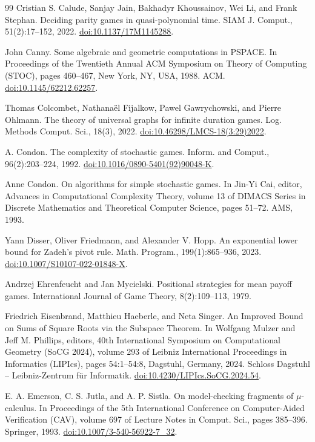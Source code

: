 \documentclass[10pt,a4paper]{article}
\theoremstyle{definition}
\begin{document}
\begin{thebibliography}{99}
 Cristian S. Calude, Sanjay Jain, Bakhadyr Khoussainov, Wei Li, and Frank Stephan. Deciding parity games in quasi-polynomial time. SIAM J. Comput., 51(2):17–152, 2022. \href{https://doi.org/10.1137/17M1145288}{doi:10.1137/17M1145288}.

 John Canny. Some algebraic and geometric computations in PSPACE. In Proceedings of the Twentieth Annual ACM Symposium on Theory of Computing (STOC), pages 460–467, New York, NY, USA, 1988. ACM. \href{https://doi.org/10.1145/62212.62257}{doi:10.1145/62212.62257}.

 Thomas Colcombet, Nathanaël Fijalkow, Pawel Gawrychowski, and Pierre Ohlmann. The theory of universal graphs for infinite duration games. Log. Methods Comput. Sci., 18(3), 2022. \href{https://doi.org/10.46298/LMCS-18(3:29)2022}{doi:10.46298/LMCS-18(3:29)2022}.

 A. Condon. The complexity of stochastic games. Inform. and Comput., 96(2):203–224, 1992. \href{https://doi.org/10.1016/0890-5401(92)90048-K}{doi:10.1016/0890-5401(92)90048-K}.

 Anne Condon. On algorithms for simple stochastic games. In Jin-Yi Cai, editor, Advances in Computational Complexity Theory, volume 13 of DIMACS Series in Discrete Mathematics and Theoretical Computer Science, pages 51–72. AMS, 1993.

 Yann Disser, Oliver Friedmann, and Alexander V. Hopp. An exponential lower bound for Zadeh’s pivot rule. Math. Program., 199(1):865–936, 2023. \href{https://doi.org/10.1007/S10107-022-01848-X}{doi:10.1007/S10107-022-01848-X}.

 Andrzej Ehrenfeucht and Jan Mycielski. Positional strategies for mean payoff games. International Journal of Game Theory, 8(2):109–113, 1979.

 Friedrich Eisenbrand, Matthieu Haeberle, and Neta Singer. An Improved Bound on Sums of Square Roots via the Subspace Theorem. In Wolfgang Mulzer and Jeff M. Phillips, editors, 40th International Symposium on Computational Geometry (SoCG 2024), volume 293 of Leibniz International Proceedings in Informatics (LIPIcs), pages 54:1–54:8, Dagstuhl, Germany, 2024. Schloss Dagstuhl – Leibniz-Zentrum für Informatik. \href{https://doi.org/10.4230/LIPIcs.SoCG.2024.54}{doi:10.4230/LIPIcs.SoCG.2024.54}.

 E. A. Emerson, C. S. Jutla, and A. P. Sistla. On model-checking fragments of $\mu$-calculus. In Proceedings of the 5th International Conference on Computer-Aided Verification (CAV), volume 697 of Lecture Notes in Comput. Sci., pages 385–396. Springer, 1993. \href{https://doi.org/10.1007/3-540-56922-7_32}{doi:10.1007/3-540-56922-7\_32}.


\end{thebibliography}
\end{document}
